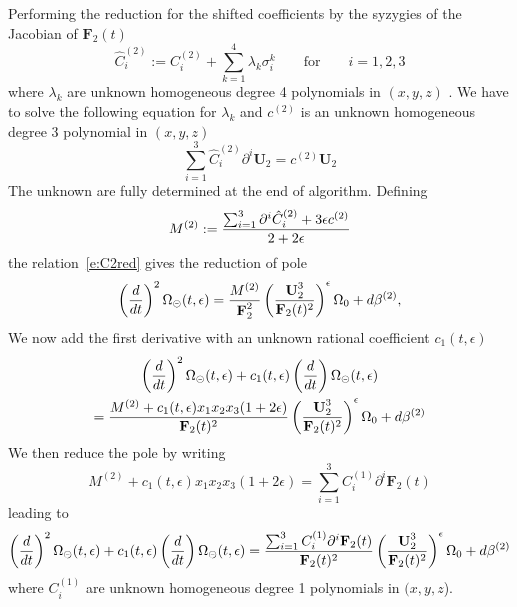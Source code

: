 \documentclass[a4paper,12pt]{article}
\numberwithin{equation}{section}
\numberwithin{figure}{subsection}
\theoremstyle{plain}
\theoremstyle{plain}
\theoremstyle{definition}
\theoremstyle{plain}
\theoremstyle{remark}
\theoremstyle{plain}
\def\su{\circleddash}
\begin{document}
%
Performing the reduction for the shifted coefficients by the syzygies
of the Jacobian of $\textbf{F}_2(t)$
\begin{equation}
    \hat C_i^{(2)}:=C_i^{(2)}+\sum_{k=1}^4 \lambda_k
      \sigma^k_i \qquad \textrm{for}\qquad i=1,2,3
    \end{equation}
    where $\lambda_k$ are unknown homogeneous degree 4 polynomials in
$(x,y,z)$ .
We have to solve the following equation for $\lambda_k$  and $c^{(2)}$ is an unknown homogeneous degree 3 polynomial
in $(x,y,z)$
\begin{equation}\label{e:C2red}
  \sum_{i=1}^3 \hat C_i^{(2)} \partial^i \textbf{U}_2 = c^{(2)} \textbf{U}_2
\end{equation}
The unknown are fully determined at the end of  algorithm.
Defining 
\begin{equation}
  \label{e:M2}
  M^{(2)}:={\sum_{i=1}^3 \partial^i \hat C_i^{(2)}+3\epsilon
    c^{(2)}\over 2+2\epsilon}
\end{equation}
the relation~\eqref{e:C2red} gives the reduction of pole
\begin{equation}
 \left(d\over dt\right)^2
 \Omega_\su(t,\epsilon)=
{M^{(2)}\over
     \textbf{F}_2^{2}}\left(\textbf{U}_2^3\over \textbf{F}_2(t)^2\right)^\epsilon \Omega_0+d\beta^{(2)},
 \end{equation}
%
We now add the first derivative with an unknown rational coefficient $c_1(t,\epsilon)$
\begin{multline}
 \left(d\over dt\right)^2
 \Omega_\su(t,\epsilon) +c_1(t,\epsilon) \left(d\over dt\right)
 \Omega_\su(t,\epsilon) \cr=
{M^{(2)}+c_1(t,\epsilon) x_1x_2x_3(1+2\epsilon)\over
     \textbf{F}_2(t)^{2}}\left(\textbf{U}_2^3\over \textbf{F}_2(t)^2\right)^\epsilon \Omega_0+d\beta^{(2)}
 \end{multline}
 We then reduce the pole by writing
 \begin{equation}\label{e:M2red}
   M^{(2)}+ c_1(t,\epsilon) x_1x_2x_3(1+2\epsilon)= \sum_{i=1}^3
   C_i^{(1)} \partial^i \textbf{F}_2(t)
 \end{equation}
leading to
\begin{equation}
 \left(d\over dt\right)^2
 \Omega_\su(t,\epsilon) +c_1(t,\epsilon) \left(d\over dt\right)
 \Omega_\su(t,\epsilon) =
{ \sum_{i=1}^3
   C_i^{(1)} \partial^i \textbf{F}_2(t)\over
     \textbf{F}_2(t)^{2}}\left(\textbf{U}_2^3\over \textbf{F}_2(t)^2\right)^\epsilon \Omega_0+d\beta^{(2)}
 \end{equation}
 where $ C_i^{(1)}$ are unknown homogeneous degree 1 polynomials in $(x,y,z$).
\end{document}
